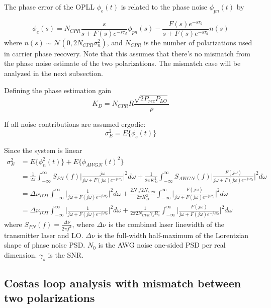 \documentclass[a4paper]{article}
\begin{document}
The phase error of the OPLL $\phi_e(t)$ is related to the phase noise $\phi_{pn}(t)$ by

\begin{equation}
\phi_e(s) = N_{CPR}\frac{s}{s + F(s)e^{-s\tau_d}}\phi_{pn}(s) - \frac{F(s)e^{-s\tau_d}}{s + F(s)e^{-s\tau_d}}n(s)
\end{equation}
where $n(s) \sim\mathcal{N}(0, 2N_{CPR}\sigma_n^2)$, and $N_{CPR}$ is the number of polarizations used in carrier phase recovery. Note that this assumes that there's no mismatch from the phase noise estimate of the two polarizations. The mismatch case will be analyzed in the next subsection.

Defining the phase estimation gain
\begin{equation}
K_D = N_{CPR}R\frac{\sqrt{2P_{rec}P_{LO}}}{p}
\end{equation}

If all noise contributions are assumed ergodic:
\begin{equation}
\sigma_E^2 = E\{\phi_e(t)\}
\end{equation}

Since the system is linear
\begin{align} \nonumber
\sigma_E^2 &= E\{\phi_n^2(t)\} + E\{\phi_{AWGN}(t)^2\} \\ \nonumber
&= \frac{1}{2\pi}\int_{-\infty}^\infty S_{PN}(f)\bigg|\frac{j\omega}{j\omega + F(j\omega)e^{-j\omega\tau_d}}\bigg|^2d\omega + \frac{1}{2\pi K_D^2}\int_{-\infty}^\infty S_{AWGN}(f)\bigg|\frac{F(j\omega)}{j\omega + F(j\omega)e^{-j\omega\tau_d}}\bigg|^2d\omega \\ \nonumber
&= \Delta\nu_{TOT}\int_{-\infty}^\infty \bigg|\frac{1}{j\omega + F(j\omega)e^{-j\omega\tau_d}}\bigg|^2d\omega + \frac{2N_0/2N_{CPR}}{2\pi K_D^2}\int_{-\infty}^\infty \bigg|\frac{F(j\omega)}{j\omega + F(j\omega)e^{-j\omega\tau_d}}\bigg|^2d\omega \\
&= \Delta\nu_{TOT}\int_{-\infty}^\infty \bigg|\frac{1}{j\omega + F(j\omega)e^{-j\omega\tau_d}}\bigg|^2d\omega + \frac{1}{2\pi 2N_{CPR}\gamma_sR_s}\int_{-\infty}^\infty \bigg|\frac{F(j\omega)}{j\omega + F(j\omega)e^{-j\omega\tau_d}}\bigg|^2d\omega \nonumber
\end{align}
where $S_{PN}(f) = \frac{\Delta\nu}{2\pi f^2}$, where $\Delta\nu$ is the combined laser linewidth of the transmitter laser and LO.  $\Delta\nu$ is the full-width half-maximum of the Lorentzian shape of phase noise PSD. $N_0$ is the AWG noise one-sided PSD per real dimension. $\gamma_s$ is the SNR.

\subsection{Costas loop analysis with mismatch between two polarizations}
\end{document}
